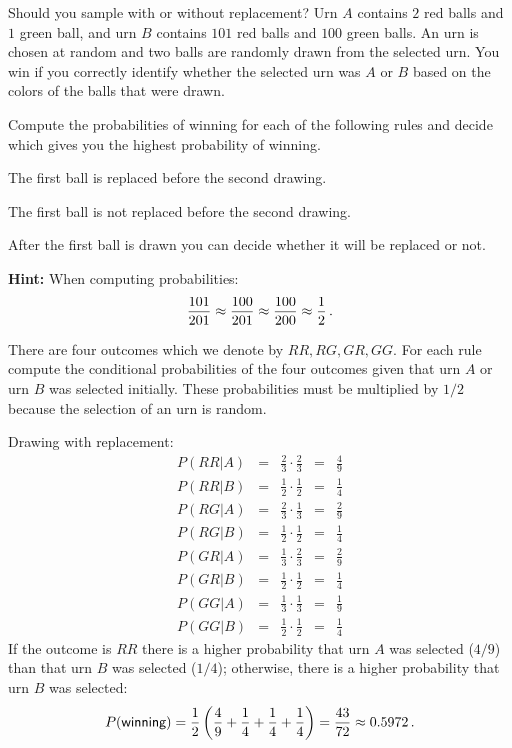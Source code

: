 

\begin{prob}{Should you sample with or without replacement?}
Urn $A$ contains $2$ red balls and $1$ green ball, and urn $B$ contains $101$ red balls and $100$ green balls. An urn is chosen at random and two balls are randomly drawn from the selected urn. You win if you correctly identify whether the selected urn was $A$ or $B$ based on the colors of the balls that were drawn.

Compute the probabilities of winning for each of the following rules and decide which gives you the highest probability of winning.

 The first ball is replaced before the second drawing.

 The first ball is not replaced before the second drawing.

 After the first ball is drawn you can decide whether it will be replaced or not.

\textbf{Hint:} When computing probabilities:
\[
\displaystyle\frac{101}{201}\approx \displaystyle\frac{100}{201} \approx \displaystyle\frac{100}{200} \approx \displaystyle\frac{1}{2}\,.
\]
\end{prob}

\solution{}

There are four outcomes which we denote by $RR, RG, GR, GG$. For each rule compute the conditional probabilities of the four outcomes given that urn $A$ or urn $B$ was selected initially. These probabilities must be multiplied by $1/2$ because the selection of an urn is random.

 Drawing with replacement:
\[
\renewcommand*{\arraystretch}{1.5}
\begin{array}{lcccc}
P(RR|A) &=& \frac{2}{3} \cdot \frac{2}{3} &=& \frac{4}{9}\\
P(RR|B) &=& \frac{1}{2} \cdot \frac{1}{2} &=& \frac{1}{4}\\
\hline
P(RG|A) &=& \frac{2}{3} \cdot \frac{1}{3} &=& \frac{2}{9}\\
P(RG|B) &=& \frac{1}{2} \cdot \frac{1}{2} &=& \frac{1}{4}\\
\hline
P(GR|A) &=& \frac{1}{3} \cdot \frac{2}{3} &=& \frac{2}{9}\\
P(GR|B) &=& \frac{1}{2} \cdot \frac{1}{2} &=& \frac{1}{4}\\
\hline
P(GG|A) &=& \frac{1}{3} \cdot \frac{1}{3} &=& \frac{1}{9}\\
P(GG|B) &=& \frac{1}{2} \cdot \frac{1}{2} &=& \frac{1}{4}\end{array}
\]
If the outcome is $RR$ there is a higher probability that urn $A$ was selected ($4/9$) than that urn $B$ was selected ($1/4$); otherwise, there is a higher probability that urn $B$ was selected:
\[
P(\textsf{winning})=\frac{1}{2}\left(\frac{4}{9} + \frac{1}{4}+ \frac{1}{4}+ \frac{1}{4}\right)=\displaystyle\frac{43}{72}\approx 0.5972\,.
\]

